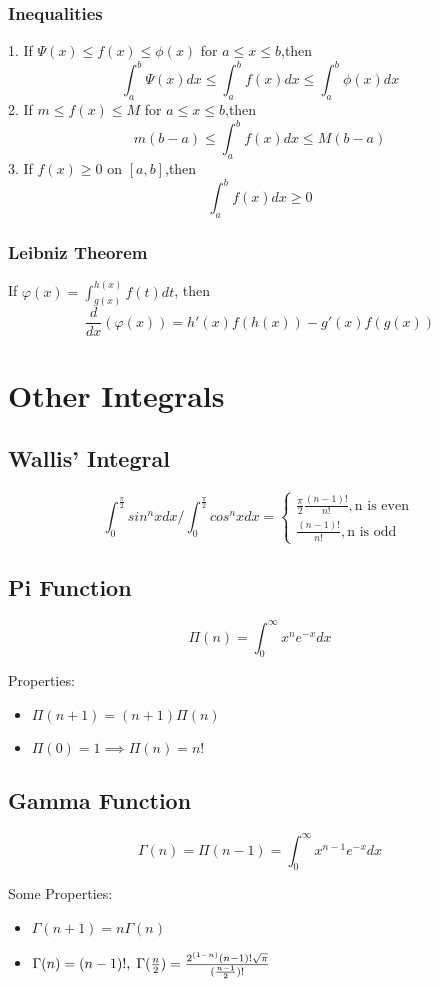 \documentclass[12pt]{article}
\begin{document}
\subsubsection{Inequalities}
1. If $\Psi(x) \le f(x) \le \phi(x)$  for $a \le x \le b$,then
$$\int_{a}^{b}\Psi(x)dx \le \int_{a}^{b}f(x)dx \le \int_{a}^{b}\phi(x)dx$$
2. If $m \le f(x) \le M$ for $a \le x \le b$,then 
$$m(b-a) \le \int_{a}^{b}f(x)dx \le M(b-a)$$
3. If $f(x) \ge 0$ on $[a,b]$,then $$\int_{a}^{b}f(x)dx \ge 0$$
\subsubsection{Leibniz Theorem} 
If $\varphi(x)=\int_{g(x)}^{h(x)}f(t)dt$, then
$$\frac{d}{dx}(\varphi(x))=h'(x)f(h(x))-g'(x)f(g(x))$$
\section{Other Integrals}
\subsection{Wallis' Integral}
$$\int_{0}^{\frac{\pi}{2}} sin^{n}xdx/\int_{0}^{\frac{\pi}{2}} cos^{n}xdx=
\begin{cases}
  \frac{\pi}{2}\frac{(n-1)!}{n!}, \text{n is even}\ \\
  
  \frac{(n-1)!}{n!},\text{n is odd}\
\end{cases} $$
\subsection{Pi Function}
$$\Pi(n)= \int_{0}^{\infty}x^{n}e^{-x}dx$$

Properties:
\begin{itemize}
\item $\Pi(n+1)=(n+1) \Pi(n)$
\item $\Pi(0)=1 \implies \Pi(n)=n!$
\end{itemize}
\subsection{Gamma Function}
$$\Gamma(n)=\Pi(n-1)= \int_{0}^{\infty}x^{n-1}e^{-x}dx$$

Some Properties:
\begin{itemize}
\item $\Gamma(n+1)=n \Gamma(n)$
\item $\Gamma(n)=(n-1)!, \thickspace \Gamma(\frac{n}{2})=\frac{2^{(1-n)} (n-1)!\sqrt{\pi}}{(\frac{n-1}{2})!}$
\end{itemize}
\end{document}
